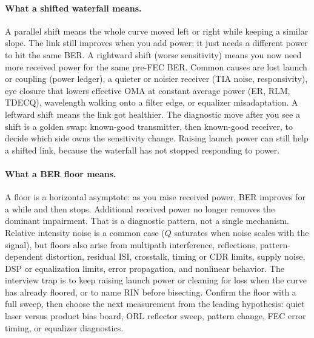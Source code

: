 \paragraph{What a shifted waterfall means.}
A parallel shift means the whole curve moved left or right while keeping a
similar slope. The link still improves when you add power; it just needs a
different power to hit the same BER. A rightward shift (worse sensitivity)
means you now need more received power for the same pre-FEC BER. Common causes
are lost launch or coupling (power ledger), a quieter or noisier receiver
(TIA noise, responsivity), eye closure that lowers effective
OMA at constant average power (ER, RLM,
TDECQ), wavelength walking onto a filter edge, or equalizer
misadaptation. A leftward shift means the link got healthier. The diagnostic
move after you see a shift is a golden swap: known-good transmitter, then
known-good receiver, to decide which side owns the sensitivity change. Raising
launch power can still help a shifted link, because the waterfall has not
stopped responding to power.

\paragraph{What a BER floor means.}
A floor is a horizontal asymptote: as you raise received power, BER improves
for a while and then stops. Additional received power no longer removes the
dominant impairment. That is a diagnostic pattern, not a single mechanism.
Relative intensity noise is a common case ($Q$ saturates when
noise scales with the signal), but floors also arise from multipath
interference, reflections, pattern-dependent distortion,
residual ISI, crosstalk, timing or CDR limits, supply noise,
DSP or equalization limits, error propagation, and nonlinear behavior. The
interview trap is to keep raising launch power or cleaning for loss when the
curve has already floored, or to name RIN before bisecting. Confirm the floor
with a full sweep, then choose the next measurement from the leading
hypothesis: quiet laser versus product bias board, ORL
reflector sweep, pattern change, FEC error timing, or equalizer diagnostics.

